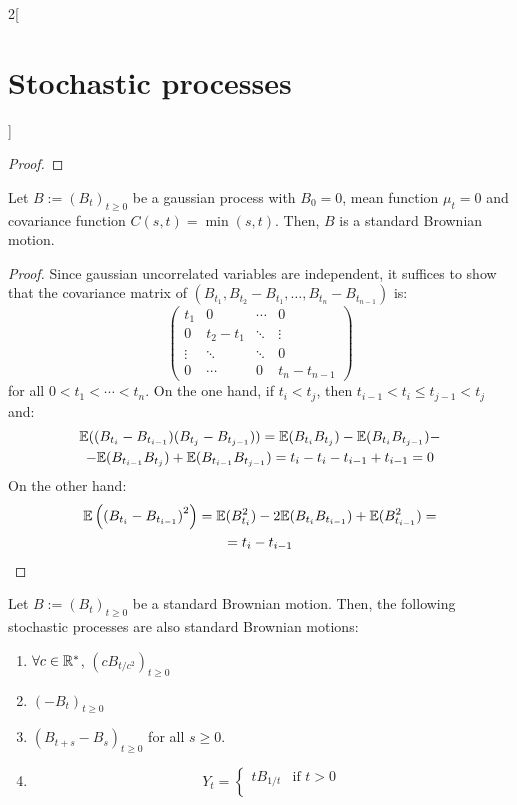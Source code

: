 \documentclass[../../../main_math.tex]{subfiles}
\begin{document}
\begin{multicols}{2}[\section{Stochastic processes}]
\begin{proof}
  \end{proof}
  \begin{proposition}
    Let $B:={(B_t)}_{t\geq 0}$ be a gaussian process with $B_0=0$, mean function $\mu_t=0$ and covariance function $C(s,t)=\min(s,t)$. Then, $B$ is a standard Brownian motion.
  \end{proposition}
  \begin{proof}
    Since gaussian uncorrelated variables are independent, it suffices to show that the covariance matrix of $(B_{t_1}, B_{t_2}-B_{t_1}, \ldots, B_{t_n}-B_{t_{n-1}})$ is:
    $$
      \begin{pmatrix}
        t_1    & 0       & \cdots & 0            \\
        0      & t_2-t_1 & \ddots & \vdots       \\
        \vdots & \ddots  & \ddots & 0            \\
        0      & \cdots  & 0      & t_n- t_{n-1}
      \end{pmatrix}
    $$
    for all $0<t_1<\cdots<t_n$. On the one hand, if $t_i<t_j$, then $t_{i-1}<t_i\leq t_{j-1}<t_j$ and:
    \begin{multline*}
      \mathbb{E}((B_{t_i}-B_{t_{i-1}})(B_{t_j}-B_{t_{j-1}}))=\mathbb{E}(B_{t_i}B_{t_j})-\mathbb{E}(B_{t_i}B_{t_{j-1}})-\\-\mathbb{E}(B_{t_{i-1}}B_{t_j})+\mathbb{E}(B_{t_{i-1}}B_{t_{j-1}})=t_i-t_{i}-t_{i-1}+t_{i-1}=0
    \end{multline*}
    On the other hand:
    \begin{multline*}
      \mathbb{E}\left({(B_{t_i}-B_{t_{i-1}})}^2\right)= \mathbb{E}(B_{t_i}^2)-2\mathbb{E}(B_{t_i}B_{t_{i-1}})+\mathbb{E}(B_{t_{i-1}}^2)=\\=t_i-t_{i-1}
    \end{multline*}
  \end{proof}
  \begin{proposition}
    Let $B:={(B_t)}_{t\geq 0}$ be a standard Brownian motion. Then, the following stochastic processes are also standard Brownian motions:
    \begin{enumerate}
      \item $\forall c\in \RR^*$, ${(cB_{t/c^2})}_{t\geq 0}$
      \item ${(-B_t)}_{t\geq 0}$
      \item ${(B_{t+s}-B_s)}_{t\geq 0}$ for all $s\geq 0$.
      \item $$
              Y_t = \begin{cases}
                t B_{1/t} & \text{if } t>0 \\

\end{cases}$$
\end{enumerate}
\end{proposition}
\end{multicols}
\end{document}
